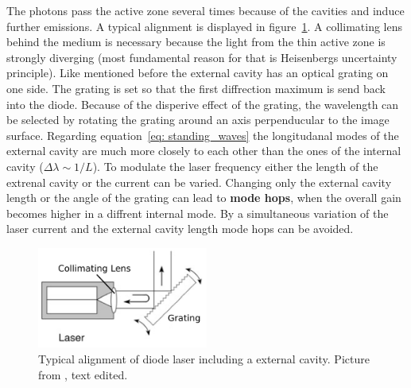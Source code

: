 The photons pass the active zone several times because of the cavities and induce further emissions. A typical alignment is displayed in figure~\ref{fig: cavity}.
A collimating lens behind the medium is necessary because the light from the thin active zone is strongly diverging (most 
fundamental reason for that is Heisenbergs uncertainty principle).
Like mentioned before the external cavity has an optical grating on one side. The grating is set so that the first diffrection maximum is send back into the
diode. Because of the disperive effect of the grating, the wavelength can be selected by rotating the grating around an axis perpenducular
to the image surface. Regarding equation~\eqref{eq: standing_waves} the longitudanal modes of the external cavity are much
more closely to each other than the ones of the internal cavity ($\Delta \lambda \sim 1 / L$).
To modulate the laser frequency either the length of the extrenal cavity or the current can be varied.
Changing only the external cavity length or the angle of the grating can lead to \textbf{mode hops}, when the overall gain becomes higher
in a diffrent internal mode. By a simultaneous variation of the laser current and the external cavity length mode hops can be avoided.

\begin{figure}
  \centering
  \includegraphics[width = 0.5\textwidth]{pics/cavity.pdf}
  \caption{Typical alignment of diode laser including a external cavity. 
  Picture from \cite{eichler}, text edited.}
  \label{fig: cavity}
\end{figure}